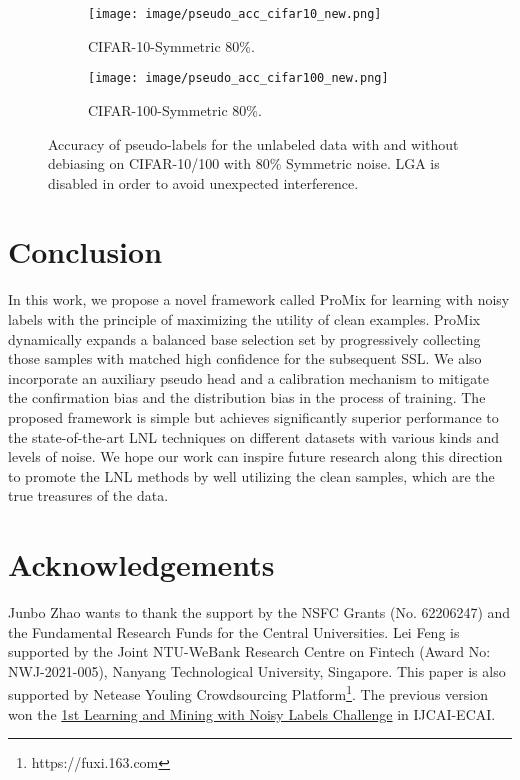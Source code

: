 \documentclass{article}
\begin{document}
\begin{figure}[t]
     \centering
     \begin{subfigure}{0.49\linewidth}
         \texttt{[image: image/pseudo\_acc\_cifar10\_new.png]}
         \caption{CIFAR-10-Symmetric 80\%.}
         \label{fig:cifar10pacc}
     \end{subfigure}
     \hfill
     \begin{subfigure}{0.49\linewidth}
         \texttt{[image: image/pseudo\_acc\_cifar100\_new.png]}
         \caption{CIFAR-100-Symmetric 80\%.}
         \label{fig:cifar100pacc}
     \end{subfigure}
     \caption{Accuracy of pseudo-labels for the unlabeled data with and without debiasing on CIFAR-10/100 with 80\% Symmetric noise. LGA is disabled in order to avoid unexpected interference.  }
     \label{fig:pseudoacc}
\end{figure}


\section{Conclusion}
In this work, we propose a novel framework called ProMix for learning with noisy labels with the principle of maximizing the utility of clean examples. ProMix dynamically expands a balanced base selection set by progressively collecting those samples with matched high confidence for the subsequent SSL. We also incorporate an auxiliary pseudo head and a calibration mechanism to mitigate the confirmation bias and the distribution bias in the process of training. The proposed framework is simple but achieves significantly superior performance to the state-of-the-art LNL techniques on different datasets with various kinds and levels of noise. We hope our work can inspire future research along this direction to promote the LNL methods by well utilizing the clean samples, which are the true treasures of the data. 
\section*{Acknowledgements}
Junbo Zhao wants to thank the support by the NSFC Grants (No. 62206247) and the Fundamental Research Funds for the Central Universities. Lei Feng is supported by the Joint NTU-WeBank Research Centre on Fintech (Award No: NWJ-2021-005), Nanyang Technological University, Singapore. This paper is also supported by Netease Youling Crowdsourcing Platform\footnote{https://fuxi.163.com}. The previous version won the \href{http://competition.noisylabels.com/}{1st Learning and Mining with Noisy Labels Challenge} in IJCAI-ECAI.
\end{document}
